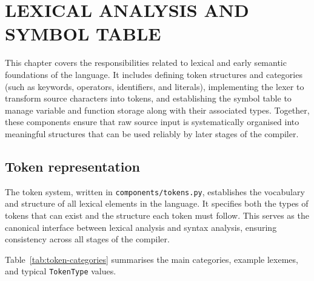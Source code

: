 \chapter{LEXICAL ANALYSIS AND SYMBOL TABLE}

This chapter covers the responsibilities related to lexical and early semantic
foundations of the language. It includes defining token structures and
categories (such as keywords, operators, identifiers, and literals), implementing
the lexer to transform source characters into tokens, and establishing the
symbol table to manage variable and function storage along with their
associated types. Together, these components ensure that raw source input is
systematically organised into meaningful structures that can be used reliably
by later stages of the compiler.

\section{Token representation}
The token system, written in \texttt{components/tokens.py}, establishes the
vocabulary and structure of all lexical elements in the language. It specifies
both the types of tokens that can exist and the structure each token must
follow. This serves as the canonical interface between lexical analysis and syntax analysis,
ensuring consistency across all stages of the compiler.

Table~\ref{tab:token-categories} summarises the main categories, example lexemes,
and typical \texttt{TokenType} values.

